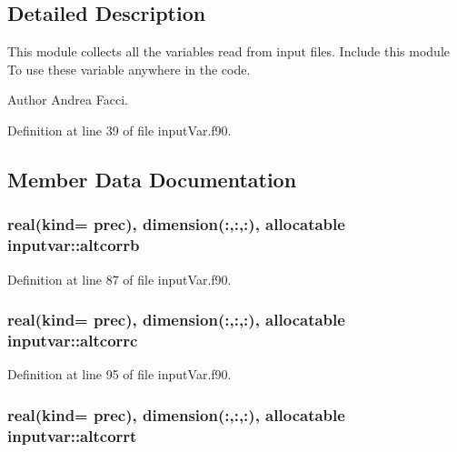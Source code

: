 \subsection{Detailed Description}
This module collects all the variables read from input files. Include this module To use these variable anywhere in the code. \begin{DoxyAuthor}{Author}
Andrea Facci. 
\end{DoxyAuthor}


Definition at line 39 of file input\-Var.\-f90.



\subsection{Member Data Documentation}
\hypertarget{classinputvar_a3fb49f59a3c5a2a19350be6bea0d69c2}{
\subsubsection[{altcorrb}]{\setlength{\rightskip}{0pt plus 5cm}real(kind= prec), dimension(\-:,\-:,\-:), allocatable inputvar\-::altcorrb}}\label{classinputvar_a3fb49f59a3c5a2a19350be6bea0d69c2}


Definition at line 87 of file input\-Var.\-f90.

\hypertarget{classinputvar_a9fe000c19d0cd93b0e53d5d6b2cbc13f}{
\subsubsection[{altcorrc}]{\setlength{\rightskip}{0pt plus 5cm}real(kind= prec), dimension(\-:,\-:,\-:), allocatable inputvar\-::altcorrc}}\label{classinputvar_a9fe000c19d0cd93b0e53d5d6b2cbc13f}


Definition at line 95 of file input\-Var.\-f90.

\hypertarget{classinputvar_a1405821026cba8a541725451f5a6f8dd}{
\subsubsection[{altcorrt}]{\setlength{\rightskip}{0pt plus 5cm}real(kind= prec), dimension(\-:,\-:,\-:), allocatable inputvar\-::altcorrt}}\label{classinputvar_a1405821026cba8a541725451f5a6f8dd}


